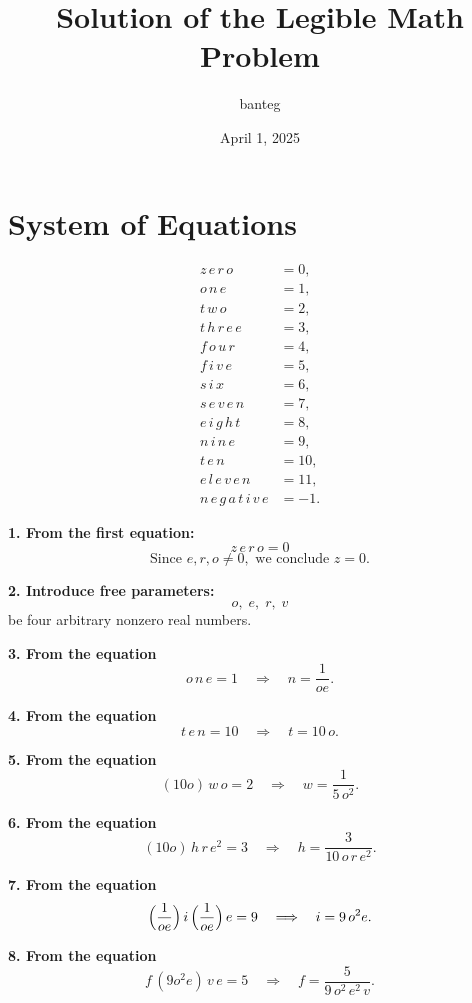 \documentclass[12pt]{article}
\theoremstyle{plain}
\begin{document}
\title{Solution of the Legible Math Problem}
\author{banteg}
\date{April 1, 2025}
\maketitle

\section*{System of Equations}
\begin{align*}
 z\,e\,r\,o &= 0,\\
 o\,n\,e &= 1,\\
 t\,w\,o &= 2,\\
 t\,h\,r\,e\,e &= 3,\\
 f\,o\,u\,r &= 4,\\
 f\,i\,v\,e &= 5,\\
 s\,i\,x &= 6,\\
 s\,e\,v\,e\,n &= 7,\\
 e\,i\,g\,h\,t &= 8,\\
 n\,i\,n\,e &= 9,\\
 t\,e\,n &= 10,\\
 e\,l\,e\,v\,e\,n &= 11,\\
 n\,e\,g\,a\,t\,i\,v\,e &= -1.
\end{align*}

\bigskip
\noindent\textbf{1. From the first equation:}
\[
 z\,e\,r\,o = 0
\]
\[
 \text{Since }e,r,o\neq 0,\text{ we conclude }
 z = 0.
\]

\bigskip
\noindent\textbf{2. Introduce free parameters:}
\[
 o,\;e,\;r,\;v
\]
be four arbitrary nonzero real numbers.

\bigskip
\noindent\textbf{3. From the equation}
\[
 o\,n\,e = 1
 \quad\Longrightarrow\quad
 n = \frac{1}{oe}.
\]

\bigskip
\noindent\textbf{4. From the equation}
\[
 t\,e\,n = 10
 \quad\Longrightarrow\quad
 t = 10\,o.
\]

\bigskip
\noindent\textbf{5. From the equation}
\[
 (10o)\,w\,o = 2
 \quad\Longrightarrow\quad
 w = \frac{1}{5\,o^2}.
\]

\bigskip
\noindent\textbf{6. From the equation}
\[
 (10o)\,h\,r\,e^2 = 3
 \quad\Longrightarrow\quad
 h = \frac{3}{10\,o\,r\,e^2}.
\]

\bigskip
\noindent\textbf{7. From the equation}
\[
 \Bigl(\frac{1}{oe}\Bigr)\,i\,\Bigl(\frac{1}{oe}\Bigr)\,e = 9
 \quad\Longrightarrow\quad
 i = 9\,o^2e.
\]

\bigskip
\noindent\textbf{8. From the equation}
\[
 f\,(9o^2e)\,v\,e = 5
 \quad\Longrightarrow\quad
 f = \frac{5}{9\,o^2\,e^2\,v}.
\]
\end{document}
